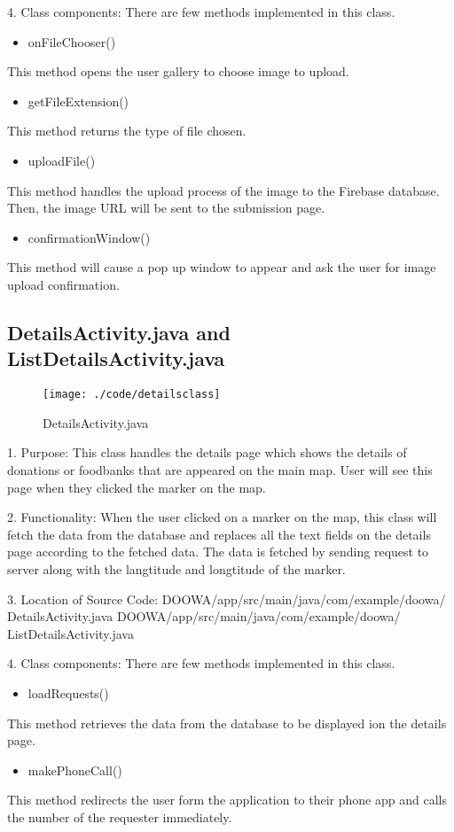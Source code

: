 \documentclass[conference]{IEEEtran}
\begin{document}
4. Class components: There are few methods implemented in this class.
\begin{itemize}
\item onFileChooser()
\end{itemize}
This method opens the user gallery to choose image to upload.
\begin{itemize}
\item getFileExtension()
\end{itemize}
This method returns the type of file chosen.
\begin{itemize}
\item uploadFile()
\end{itemize}
This method handles the upload process of the image to the Firebase database. Then, the image URL will be sent to the submission page.
\begin{itemize}
\item confirmationWindow()
\end{itemize}
This method will cause a pop up window to appear and ask the user for image upload confirmation.
\break
\subsection{DetailsActivity.java and ListDetailsActivity.java}
\begin{figure}[h!]
\texttt{[image: ./code/detailsclass]}
\centering
\caption{DetailsActivity.java}
\end{figure}
1. Purpose: This class handles the details page which shows the details of donations or foodbanks that are appeared on the main map. User will see this page when they clicked the marker on the map.\break
\par 2. Functionality: When the user clicked on a marker on the map, this class will fetch the data from the database and replaces all the text fields on the details page according to the fetched data. The data is fetched by sending request to server along with the langtitude and longtitude of the marker.\break

3. Location of Source Code: DOOWA/app/src/main/java/com/example/doowa/ DetailsActivity.java
DOOWA/app/src/main/java/com/example/doowa/ ListDetailsActivity.java\break

4. Class components: There are few methods implemented in this class.
\begin{itemize}
\item loadRequests()
\end{itemize}
This method retrieves the data from the database to be displayed ion the details page.
\begin{itemize}
\item makePhoneCall()
\end{itemize}
This method redirects the user form the application to their phone app and calls the number of the requester immediately.
\break
\end{document}
